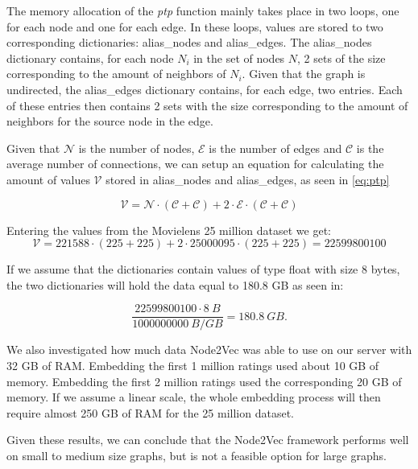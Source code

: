 The memory allocation of the \textit{ptp} function mainly takes place in two loops, one for each node and one for each edge.
In these loops, values are stored to two corresponding dictionaries: alias\_nodes and alias\_edges.
The alias\_nodes dictionary contains, for each node $N_i$ in the set of nodes $N$, 2 sets of the size corresponding to the amount of neighbors of $N_i$.
Given that the graph is undirected, the alias\_edges dictionary contains, for each edge, two entries. Each of these entries then contains 2 sets with the size corresponding to the amount of neighbors for the source node in the edge.

Given that $\mathcal{N}$ is the number of nodes, $\mathcal{E}$ is the number of edges and $\mathcal{C}$ is the average number of connections, we can setup an equation for calculating the amount of values $\mathcal{V}$ stored in alias\_nodes and alias\_edges, as seen in \autoref{eq:ptp}

\begin{equation}
  \label{eq:ptp}
  \mathcal{V} = \mathcal{N} \cdot (\mathcal{C} + \mathcal{C}) + 2 \cdot \mathcal{E} \cdot (\mathcal{C} + \mathcal{C})
\end{equation}

Entering the values from the Movielens 25 million dataset we get:
$$
\mathcal{V} = 221588 \cdot (225 + 225) + 2 \cdot 25000095 \cdot (225 + 225) = 22599800100
$$


If we assume that the dictionaries contain values of type float with size 8 bytes, the two dictionaries will hold the data equal to 180.8 GB as seen in:

$$
  \frac{22599800100 \cdot 8 \ B}{1000000000 \ B/GB} = 180.8 \ GB.
$$

We also investigated how much data Node2Vec was able to use on our server with 32 GB of RAM. Embedding the first 1 million ratings used about 10 GB of memory. Embedding the first 2 million ratings used the corresponding 20 GB of memory. If we assume a linear scale, the whole embedding process will then require almost 250 GB of RAM for the 25 million dataset.

Given these results, we can conclude that the Node2Vec framework performs well on small to medium size graphs, but is not a feasible option for large graphs.


